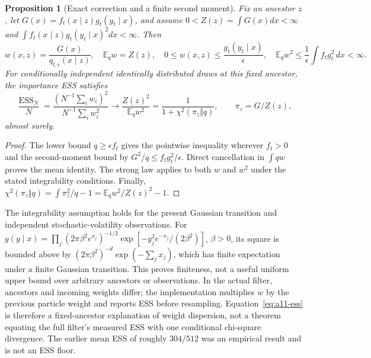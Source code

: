 \documentclass[11pt]{article}
\newtheorem{proposition}{Proposition}
\DeclareMathOperator{\ESS}{ESS}
\begin{document}
\begin{proposition}[Exact correction and a finite second moment]
\label{prop:a11-weights}
Fix an ancestor $z$, let $G(x)=f_t(x\mid z)g_t(y_t\mid x)$, and assume
$0<Z(z)=\int G(x)dx<\infty$ and
$\int f_t(x\mid z)g_t(y_t\mid x)^2dx<\infty$. Then
\begin{equation}
 w(x,z)=\frac{G(x)}{q_{t,\epsilon}(x\mid z)},\quad
 \mathbb E_q w=Z(z),\quad
 0\le w(x,z)\le\frac{g_t(y_t\mid x)}{\epsilon},\quad
 \mathbb E_qw^2\le\frac1\epsilon\int f_tg_t^2\,dx<\infty.
 \label{eq:a11-weights}
\end{equation}
For conditionally independent identically distributed draws at this fixed
ancestor, the importance ESS satisfies
\begin{equation}
 \frac{\ESS_N}{N}
 =\frac{(N^{-1}\sum_iw_i)^2}{N^{-1}\sum_iw_i^2}
 \longrightarrow \frac{Z(z)^2}{\mathbb E_qw^2}
 =\frac1{1+\chi^2(\pi_z\Vert q)},\qquad
 \pi_z=G/Z(z),
 \label{eq:a11-ess}
\end{equation}
almost surely.
\end{proposition}
\begin{proof}
The lower bound $q\ge\epsilon f_t$ gives the pointwise inequality wherever
$f_t>0$ and the second-moment bound by
$G^2/q\le f_tg_t^2/\epsilon$. Direct cancellation in $\int qw$ proves the
mean identity. The strong law applies to both $w$ and $w^2$ under the stated
integrability conditions. Finally,
$\chi^2(\pi_z\Vert q)=\int\pi_z^2/q-1
=\mathbb E_qw^2/Z(z)^2-1$.
\end{proof}

The integrability assumption holds for the present Gaussian transition and
independent stochastic-volatility observations. For
$g(y\mid x)=\prod_j(2\pi\beta^2 e^{x_j})^{-1/2}
\exp[-y_j^2e^{-x_j}/(2\beta^2)]$, $\beta>0$, its square is bounded above by
$(2\pi\beta^2)^{-d}\exp(-\sum_jx_j)$, which has finite expectation under a
finite Gaussian transition. This proves finiteness, not a useful uniform
upper bound over arbitrary ancestors or observations. In the actual filter,
ancestors and incoming weights differ; the implementation multiplies $w$
by the previous particle weight and reports ESS before resampling.
Equation~\eqref{eq:a11-ess} is therefore a fixed-ancestor explanation of
weight dispersion, not a theorem equating the full filter's measured ESS
with one conditional chi-square divergence. The earlier mean ESS of roughly
$304/512$ was an empirical result and is not an ESS floor.
\end{document}
